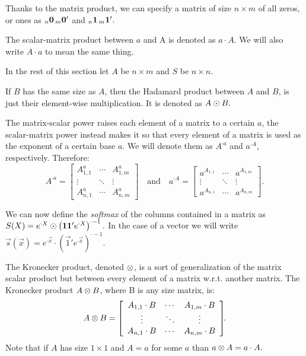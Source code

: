 \documentclass[pdflatex,sn-mathphys-num]{sn-jnl}%
\theoremstyle{thmstyleone}%
\theoremstyle{thmstyletwo}%
\theoremstyle{thmstylethree}%
\begin{document}
Thanks to the matrix product, we can specify a matrix of size \(n \times m\) of
all zeros, or ones as \(\cmat 0 n m\) and \(\cmat 1 n m.\)

The scalar-matrix product between \(a\) and A is denoted as \(a \cdot A.\)
We will also write \(A \cdot a\) to mean the same thing.

In the rest of this section let \(A\) be \(n \times m\) and \(S\) be \(n \times
n.\)

If \(B\) has the same size as \(A\), then the Hadamard product between $A$ and $B$, is
just their element-wise multiplication. It is denoted as \(A \odot B.\)

The matrix-scalar power raises each element of a matrix to a certain \(a\), the
scalar-matrix power instead makes it so that every element of a matrix is used as
the exponent of a certain base \(a\). We will denote them as \(A^{{\cdot}a}\) and
\(a^{{\cdot}A}\), respectively. 
Therefore: \[
    A^{{\cdot}a} =
    \left[\begin{array}{ccc}
        A_{1,1}^a & \cdots & A_{1,m}^a \\
        \vdots & \ddots & \vdots \\
        A_{n,1}^a & \cdots & A_{n,m}^a
    \end{array}\right]
    \quad\mathrm{and}\quad
    a^{{\cdot}A} =
    \left[\begin{array}{ccc}
        a^{A_{1,1}} & \cdots & a^{A_{1,m}} \\
        \vdots & \ddots & \vdots \\
        a^{A_{n,1}} & \cdots & a^{A_{n,m}}
    \end{array}\right]\!\!.
\]

We can now define the \emph{softmax} of the columns contained in a matrix as \(S(X) =
e^{{\cdot}X} \odot \left(\mathbf{1} \mathbf{1}' e^{{\cdot}X}\right)^{{\cdot}-1}.\) In
the case of a vector we will write \(\vec s(\vec x) = e^{{\cdot}\vec x}
\cdot (\vec 1' e^{{\cdot}\vec x})^{{\cdot}-1}.\)

The Kronecker product, denoted $\otimes$, is a sort of generalization of the
matrix scalar product but between every element of a matrix w.r.t. another
matrix. The Kronecker product \(A \otimes B\), where B is any size matrix, is: \[
    A \otimes B = \left[\begin{array}{ccc}
        A_{1,1} \cdot B & \cdots & A_{1,m} \cdot B \\
        \vdots & \ddots & \vdots \\
        A_{n,1} \cdot B & \cdots & A_{n,m} \cdot B
    \end{array}\right]\!\!.\]
Note that if \(A\) has size \(1 \times 1\) and \(A = a\) for some \(a\) than \(a
\otimes A = a \cdot A.\)
\end{document}

